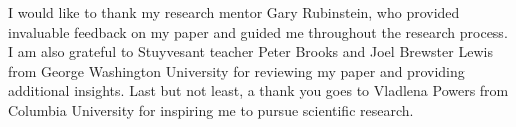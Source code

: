 I would like to thank my research mentor Gary Rubinstein, who provided invaluable feedback on my paper and guided me throughout the research process. I am also grateful to Stuyvesant teacher Peter Brooks and Joel Brewster Lewis from George Washington University for reviewing my paper and providing additional insights. Last but not least, a thank you goes to Vladlena Powers from Columbia University for inspiring me to pursue scientific research.